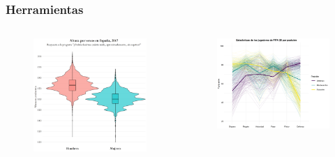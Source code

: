 \documentclass{beamer}
\begin{document}
\begin{frame}\frametitle{Herramientas}
	\begin{columns}
		\begin{column}{0.5\textwidth}
			\begin{figure}
				\centering
				\includegraphics[width=\textwidth]{images/25.png}
			\end{figure}
		\end{column}
	\pause
		\begin{column}{0.5\textwidth}
			\begin{figure}
				\centering
				\includegraphics[width=\textwidth]{images/29.png}
			\end{figure}
		\end{column}
	\end{columns}
	
\end{frame}
\end{document}
